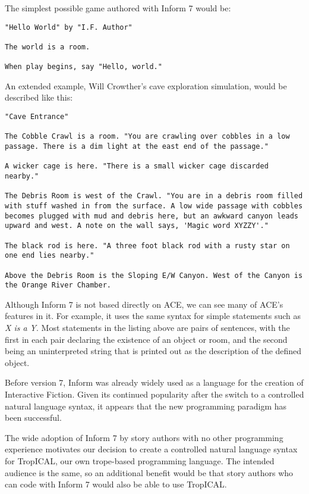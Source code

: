The simplest possible game authored with Inform 7 would be:

\begin{lstlisting}
"Hello World" by "I.F. Author"

The world is a room.

When play begins, say "Hello, world."
\end{lstlisting}

An extended example, Will Crowther's cave exploration simulation, would be
described like this:

\begin{lstlisting}
"Cave Entrance"

The Cobble Crawl is a room. "You are crawling over cobbles in a low passage. There is a dim light at the east end of the passage."

A wicker cage is here. "There is a small wicker cage discarded nearby."

The Debris Room is west of the Crawl. "You are in a debris room filled with stuff washed in from the surface. A low wide passage with cobbles becomes plugged with mud and debris here, but an awkward canyon leads upward and west. A note on the wall says, 'Magic word XYZZY'."

The black rod is here. "A three foot black rod with a rusty star on one end lies nearby."

Above the Debris Room is the Sloping E/W Canyon. West of the Canyon is the Orange River Chamber.
\end{lstlisting}

Although Inform 7 is not based directly on ACE, we can see many of ACE's
features in it. For example, it uses the same syntax for simple statements such
as \emph{X is a Y}. Most statements in the listing above are pairs of sentences,
with the first in each pair declaring the existence of an object or room, and
the second being an uninterpreted string that is printed out as the description
of the defined object.

Before version 7, Inform was already widely used as a language for the creation
of Interactive Fiction. Given its continued popularity after the switch to
a controlled natural language syntax, it appears that the new programming
paradigm has been successful.

The wide adoption of Inform 7 by story authors with no other programming
experience motivates our decision to create a controlled natural language syntax
for TropICAL, our own trope-based programming language. The intended audience is
the same, so an additional benefit would be that story authors who can code with
Inform 7 would also be able to use TropICAL.

